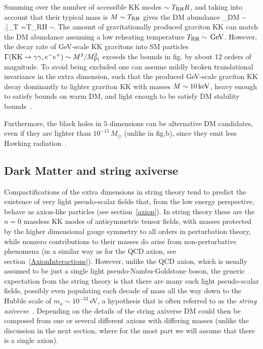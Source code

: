 Summing over the number of accessible KK modes $\sim T_{\rm RH} R$,
and taking into account that their typical mass is $M \sim T_{\rm RH}$
gives the DM abundance
\beq 
\label{eq:KKgravitational:freeze-in}
\Omega_{\rm DM} \sim {} 
\left.\right|_{T =T_{\rm RH}}  \sim  {}.
\eeq
The amount of gravitationally produced  graviton KK can match the DM abundance
assuming a low reheating temperature  $T_{\rm RH} \sim\,{\rm GeV}$.
However, the decay rate of GeV-scale KK gravitons into SM particles
$\Gamma({\rm KK}\to \gamma\gamma, e^-e^+)\sim M^3/M_{\rm Pl}^2$ 
exceeds the bounds in fig. by about 12 orders of magnitude.
To avoid being excluded one can assume mildly broken translational invariance in the extra dimension, 
such that the produced GeV-scale graviton KK
decay dominantly to lighter graviton KK with masses $M \sim 10\,{\rm keV}$,
heavy enough to satisfy bounds on warm DM, and light enough to be satisfy DM stability bounds~\cite{SwamplandDM}.

Furthermore, the black holes in $5$ dimensions can be alternative DM candidates, even if they are lighter than $10^{-15}\,M_\odot$
(unlike in fig.b), since they emit less Hawking radiation~\cite{SwamplandDM}.


\subsection{Dark Matter and string axiverse}\label{sec:stringaxiverse}
Compactifications of the extra dimensions in string theory tend to predict the existence of very light pseudo-scalar fields that, from the low energy perspective, behave as axion-like particles
(see section~\ref{axion}).
In string theory these are the $n=0$ massless KK modes of antisymmetric tensor fields, 
with masses protected by the higher dimensional gauge symmetry to all orders in perturbation theory, while nonzero contributions to their masses do arise from non-perturbative phenomena (in a similar way as for the QCD axion, see section~\ref{AxionInteractions}). 
However, unlike the QCD axion, which is usually assumed to be just a single light pseudo-Nambu-Goldstone boson, 
the generic expectation from the string theory is that there are many such light pseudo-scalar fields, possibly even populating each decade of mass all the way down to the Hubble scale of $m_a\sim 10^{-33}$\,eV, a hypothesis that is often referred to as the {\em string axiverse}~\cite{axiverse}. 
Depending on the details of the string axiverse DM could then be composed from one or several different axions with differing masses 
(unlike the discussion in the next section, where for the most part we will assume that there is a single axion). 



